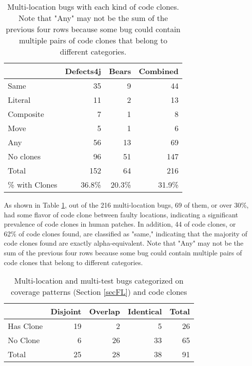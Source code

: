 \documentclass[sigconf, timestamp-false, anonymous=true]{acmart}
\begin{document}
\begin{table}
{\begin{center}
\begin{tabular} {| l | r | r | r |}
\hline
& Defects4j & Bears & Combined \\
\hline
Same & 35 & 9 & 44  \\ 
Literal & 11 & 2 & 13  \\
Composite & 7 & 1 & 8  \\
Move & 5 & 1 & 6  \\ \hline
Any & 56 & 13 & 69  \\ \hline
No clones & 96  &  51 & 147 \\ \hline
Total & 152 & 64 & 216 \\ \hline
\% with Clones & 36.8\% & 20.3\% & 31.9\% \\ \hline
\end{tabular}
\end{center}
}
\caption{Multi-location bugs with each kind of code clones. Note that "Any" may not
	be the sum of the previous four rows because some bug could contain multiple pairs of code clones that
	belong to different categories.}
\label{tab:clones}
\end{table}

As shown in Table \ref{tab:clones}, out of the 216 multi-location bugs,
69 of them, or over 30\%, had some flavor of code clone between faulty locations, indicating a significant 
prevalence of code clones in human patches. In addition, 44 of code clones, or 62\% of code clones 
found, are classified as "same," indicating that the majority of code clones found are exactly 
alpha-equivalent. Note that "Any" may not
be the sum of the previous four rows because some bug could contain multiple pairs of code clones that
belong to different categories.

\begin{table}
{\begin{center}
\begin{tabular} {| l | r r r | r |}
\hline
& Disjoint & Overlap & Identical & Total \\
\hline
Has Clone & 19 & 2 & 5 & 26 \\
No Clone & 6 & 26 & 33 &  65\\ \hline
Total & 25 & 28 & 38 & 91 \\ \hline
\end{tabular}
\end{center}
}
\caption{Multi-location and multi-test bugs categorized on coverage patterns (Section 
\ref{secFL}) and code clones}
\label{tab:cov_clones}
\end{table}
\end{document}
